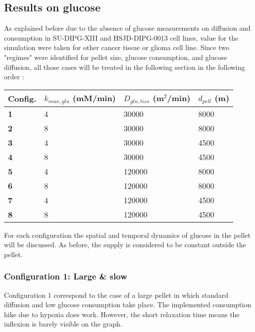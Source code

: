 \documentclass[11pt,a4paper]{article}
\begin{document}
\newpage
\subsection{Results on glucose}
As explained before due to the absence of glucose measurements on diffusion and consumption in SU-DIPG-XIII and HSJD-DIPG-0013 cell lines, value for the simulation were taken for other cancer tissue or glioma cell line. Since two "regimes" were identified for pellet size, glucose consumption, and glucose diffusion, all those cases will be treated in the following section in the following order :

\begin{table}[h]
	\begin{center}
		\begin{tabular}{ |p{15mm}|p{41mm}|p{34mm}|p{27mm}|}
			\hline
			\textbf{Config.} & $k_{max,glu}$ (mM/min) & $D_{glu,tiss}$ (\textmu m$^2$/min) & $d_{pell}$ (\textmu m) \\
			\hline
			\textbf{1} & 4 & 30000 & 8000 \\
			\hline
			\textbf{2} & 8 & 30000 & 8000 \\
			\hline
			\textbf{3} & 4 & 30000 & 4500 \\
			\hline
			\textbf{4} & 8 & 30000 & 4500 \\
			\hline
			\textbf{5} & 4 & 120000 & 8000 \\
			\hline
			\textbf{6} & 8 & 120000 & 8000 \\
			\hline
			\textbf{7} & 4 & 120000 & 4500 \\
			\hline
			\textbf{8} & 8 & 120000 & 4500 \\
			\hline
		\end{tabular}
	\end{center}
\end{table}

For each configuration the spatial and temporal dynamics of glucose in the pellet will be discussed. As before, the supply is considered to be constant outside the pellet.

\subsubsection{Configuration 1: Large \& slow}
Configuration 1 correspond to the case of a large pellet in which standard diffusion and low glucose consumption take place. The implemented consumption hike due to hypoxia does work. However, the short relaxation time means the inflexion is barely visible on the graph.
\end{document}

